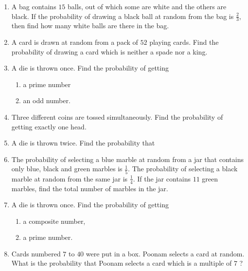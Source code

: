 \begin{enumerate}
\item A bag contains $15$ balls, out of which some are white and the others are black. If the probability of drawing a black ball at random from the bag is $\frac{2}{3}$, then find how many white balls are there in the bag.

\item A card is drawn at random from a pack of $52$ playing cards. Find the probability of drawing a card which is neither a spade nor a king.

\item A die is thrown once. Find the probability of getting
\begin{enumerate}
    \item a prime number
    \item an odd number. 
\end{enumerate}

\item Three different coins are tossed simultaneously. Find the probability of getting exactly one head.

\item A die is thrown twice. Find the probability that
\begin{enumerate}
\end{enumerate}

\item The probability of selecting a blue marble at random from a jar that contains only blue, black and green marbles is $\frac{1}{5}$. The probability of selecting a black marble at random from the same jar is $\frac{1}{4}$. If the jar contains $11$ green marbles, find the total number of marbles in the jar.

\item A die is thrown once. Find the probability of getting
\begin{enumerate}
\item a composite number,
\item a prime number.
\end{enumerate}

\item Cards numbered $7$ to $40$ were put in a box. Poonam selects a card at
random. What is the probability that Poonam selects a card which is a
multiple of $7$ ?

\end{enumerate}
